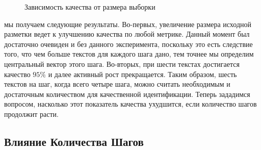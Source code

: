 \documentclass[12pt]{article}
\begin{document}
\begin{figure}[h!]
\label{fig:image1}
 \caption{Зависимость качества от размера выборки}
\end{figure}

мы получаем  следующие результаты. Во-первых, увеличение размера исходной разметки ведет к улучшению качества по любой метрике. Данный момент был достаточно очевиден и без данного эксперимента, поскольку это есть следствие того, что чем больше текстов для каждого шага дано, тем точнее мы определим центральный вектор этого шага. Во-вторых, при шести текстах достигается качество $95\%$ и далее активный рост прекращается. Таким образом, шесть текстов на шаг, когда всего четыре шага, можно считать необходимым и достаточным количеством для качественной идентификации. Теперь зададимся вопросом, насколько этот показатель качества ухудшится, если количество шагов продолжит расти.

\subsection{Влияние Количества Шагов}
\end{document}
